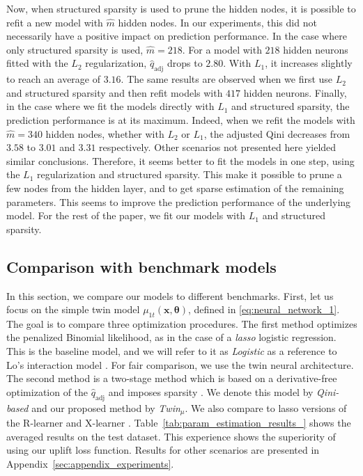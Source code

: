 \documentclass{article}
\def\qadj{\hat{q}_{\mathrm{adj}}}
\def\x{\mathbf x}
\def \vahid {\color{magenta}}
\begin{document}
Now, when structured sparsity is used to prune the hidden nodes, it is possible to refit a new model with $\hat{m}$ hidden nodes. In our experiments, this did not necessarily have a positive impact on prediction performance. In the case where only structured sparsity is used, $\hat{m} = 218$. For a model with $ 218 $ hidden neurons fitted with the $ L_2 $ regularization, $\qadj$ drops to $ 2.80 $. With $ L_1 $, it increases slightly to reach an average of $ 3.16 $. The same results are observed when we first use $ L_2 $ and structured sparsity and then refit models with $417$ hidden neurons. Finally, in the case where we fit the models directly with $ L_1 $ and structured sparsity, the prediction performance is at its maximum. Indeed, when we refit the models with $ \hat{m} = 340 $ hidden nodes, whether with $ L_2 $ or $ L_1 $, the adjusted Qini decreases from $3.58$ to $ 3.01 $ and $ 3.31 $ respectively. Other scenarios not presented here yielded similar conclusions. Therefore, it seems better to fit the models in one step, using the $ L_1 $ regularization and structured sparsity. This make it possible to prune a few nodes from the hidden layer, and to get sparse estimation of the remaining parameters. This seems to improve the prediction performance of the underlying model. For the rest of the paper, we fit our models with $ L_1 $ and structured sparsity. 

\subsection{Comparison with benchmark models}
In this section, we compare our models to different benchmarks. First, let us focus on the simple twin model $\mu_{1t}(\x, \boldsymbol{\theta})$, defined in \eqref{eq:neural_network_1}. The goal is to compare three optimization procedures. The first method optimizes the penalized Binomial likelihood, as in the case of a {\it lasso} logistic regression. This is the baseline model, and we will refer to it as \textit{Logistic} as a reference to Lo's interaction model \citep{lo2002true}. For fair comparison, we use the twin neural architecture. The second method is a two-stage method which %
is based on a derivative-free optimization of the $\qadj$ and imposes sparsity \citep{belba2019qbased}. %
We denote this model by \textit{Qini-based} and our proposed method by {\it Twin$_{\mu}$}. We also compare to lasso versions of the R-learner \citep{NieWager2020Quasi} and X-learner \citep{kunzel2019metalearners}. Table~\ref{tab:param_estimation_results_} shows the averaged results on the test dataset. This experience shows the superiority of using our uplift loss function. Results for other scenarios are presented in Appendix~\ref{sec:appendix_experiments}.\\
\end{document}

